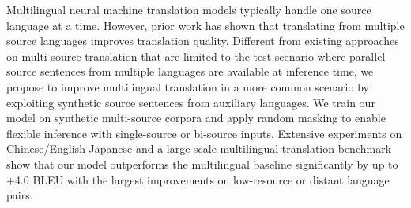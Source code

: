 Multilingual neural machine translation models typically handle one source language at a time. However, prior work has shown that translating from multiple source languages improves translation quality. Different from existing approaches on multi-source translation that are limited to the test scenario where parallel source sentences from multiple languages are available at inference time, we propose to improve multilingual translation in a more common scenario by exploiting synthetic source sentences from auxiliary languages. We train our model on synthetic multi-source corpora and apply random masking to enable flexible inference with single-source or bi-source inputs. Extensive experiments on Chinese/English-Japanese and a large-scale multilingual translation benchmark show that our model outperforms the multilingual baseline significantly by up to +4.0 BLEU with the largest improvements on low-resource or distant language pairs.
